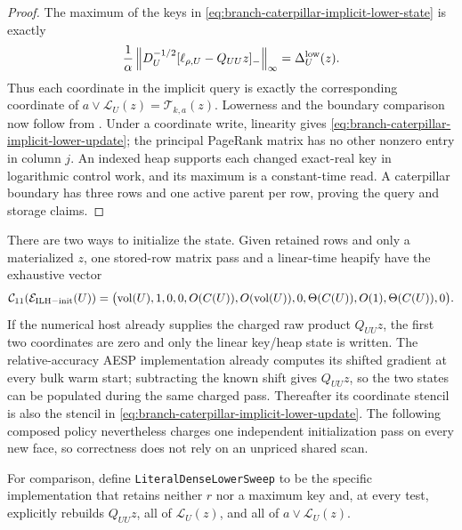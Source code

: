 \begin{proof}
The maximum of the keys in
\cref{eq:branch-caterpillar-implicit-lower-state} is exactly
\begin{equation*}
 \frac1\alpha
 \left\lVert D_U^{-1/2}[\ell_{\rho,U}-Q_{UU}z]_-\right\rVert_\infty
 =\Delta_U^{\rm low}(z).
\end{equation*}
Thus each coordinate in the implicit query is exactly the corresponding
coordinate of
$a\vee\mathcal L_U(z)=\mathcal T_{k,a}(z)$.  Lowerness and the boundary
comparison now follow from
.  Under a coordinate
write, linearity gives
\cref{eq:branch-caterpillar-implicit-lower-update}; the principal PageRank
matrix has no other nonzero entry in column $j$.  An indexed heap supports
each changed exact-real key in logarithmic control work, and its maximum is a
constant-time read.  A caterpillar boundary has three rows and one active
parent per row, proving the query and storage claims.
\end{proof}

There are two ways to initialize the state.  Given retained rows and only a
materialized $z$, one stored-row matrix pass and a linear-time heapify have
the exhaustive vector
\begin{equation}
 \mathcal C_{11}(\mathcal E_{\rm ILH-init}(U))=
 \bigl(\operatorname{vol}(U),1,0,0,O(C(U)),O(\operatorname{vol}(U)),0,
       \Theta(C(U)),O(1),\Theta(C(U)),0\bigr).
 \label{eq:branch-caterpillar-implicit-lower-init-vector}
\end{equation}
If the numerical host already supplies the charged raw product $Q_{UU}z$,
the first two coordinates are zero and only the linear key/heap state is
written.  The relative-accuracy AESP implementation already computes its
shifted gradient at every bulk warm start; subtracting the known shift gives
$Q_{UU}z$, so the two states can be populated during the same charged pass.
Thereafter its coordinate stencil is also the stencil in
\cref{eq:branch-caterpillar-implicit-lower-update}.  The following composed
policy nevertheless charges one independent initialization pass on every
new face, so correctness does not rely on an unpriced shared scan.

For comparison, define \texttt{LiteralDenseLowerSweep} to be the specific
implementation that retains neither $r$ nor a maximum key and, at every
test, explicitly rebuilds $Q_{UU}z$, all of
$\mathcal L_U(z)$, and all of $a\vee\mathcal L_U(z)$.

